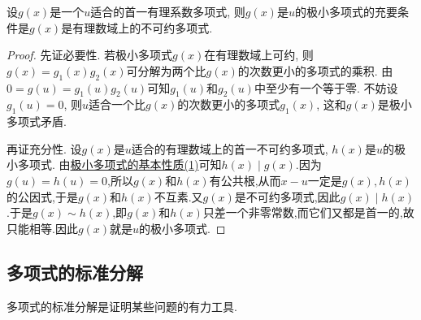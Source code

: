 \documentclass[../../main.tex]{subfiles}
\begin{document}
\begin{proposition}[极小多项式式的充要条件]\label{proposition:极小多项式式的充要条件}
设\(g(x)\)是一个\(u\)适合的首一有理系数多项式, 则\(g(x)\)是\(u\)的极小多项式的充要条件是\(g(x)\)是有理数域上的不可约多项式.
\end{proposition}
\begin{proof}
先证必要性. 若极小多项式\(g(x)\)在有理数域上可约, 则\(g(x)=g_1(x)g_2(x)\)可分解为两个比\(g(x)\)的次数更小的多项式的乘积. 由\(0 = g(u)=g_1(u)g_2(u)\)可知\(g_1(u)\)和\(g_2(u)\)中至少有一个等于零. 不妨设\(g_1(u)=0\), 则\(u\)适合一个比\(g(x)\)的次数更小的多项式\(g_1(x)\), 这和\(g(x)\)是极小多项式矛盾. 

再证充分性. 设\(g(x)\)是\(u\)适合的有理数域上的首一不可约多项式, \(h(x)\)是\(u\)的极小多项式. 由\hyperref[proposition:极小多项式的基本性质]{极小多项式的基本性质(1)}可知\(h(x)\mid g(x)\).因为$g(u)=h(u)=0$,所以$g(x)$和$h(x)$有公共根,从而$x-u$一定是$g(x),h(x)$的公因式,于是$g(x)$和$h(x)$不互素.又\(g(x)\)是不可约多项式,因此$g(x)\mid h(x)$.于是$g(x)\sim h(x)$,即\(g(x)\)和\(h(x)\)只差一个非零常数,而它们又都是首一的,故只能相等.因此\(g(x)\)就是\(u\)的极小多项式.

\end{proof}

\subsection{多项式的标准分解}

多项式的标准分解是证明某些问题的有力工具.
\end{document}
